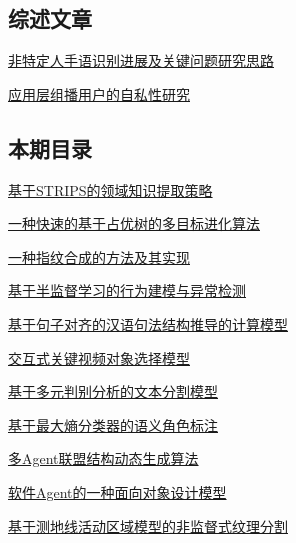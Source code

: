 \documentclass[a4paper]{article}
\begin{document}
\subsection{综述文章}
\href{http://www.jos.org.cn/ch/reader/download_pdf.aspx?file_no=20070301&year_id=2007&quarter_id=3&falg=1}{非特定人手语识别进展及关键问题研究思路}

\href{http://www.jos.org.cn/ch/reader/download_pdf.aspx?file_no=20070316&year_id=2007&quarter_id=3&falg=1}{应用层组播用户的自私性研究}

\subsection{本期目录}
\href{http://www.jos.org.cn/ch/reader/download_pdf.aspx?file_no=20070302&year_id=2007&quarter_id=3&falg=1}{基于STRIPS的领域知识提取策略}

\href{http://www.jos.org.cn/ch/reader/download_pdf.aspx?file_no=20070303&year_id=2007&quarter_id=3&falg=1}{一种快速的基于占优树的多目标进化算法}

\href{http://www.jos.org.cn/ch/reader/download_pdf.aspx?file_no=20070304&year_id=2007&quarter_id=3&falg=1}{一种指纹合成的方法及其实现}

\href{http://www.jos.org.cn/ch/reader/download_pdf.aspx?file_no=20070305&year_id=2007&quarter_id=3&falg=1}{基于半监督学习的行为建模与异常检测}

\href{http://www.jos.org.cn/ch/reader/download_pdf.aspx?file_no=20070306&year_id=2007&quarter_id=3&falg=1}{基于句子对齐的汉语句法结构推导的计算模型}

\href{http://www.jos.org.cn/ch/reader/download_pdf.aspx?file_no=20070307&year_id=2007&quarter_id=3&falg=1}{交互式关键视频对象选择模型}

\href{http://www.jos.org.cn/ch/reader/download_pdf.aspx?file_no=20070308&year_id=2007&quarter_id=3&falg=1}{基于多元判别分析的文本分割模型}

\href{http://www.jos.org.cn/ch/reader/download_pdf.aspx?file_no=20070309&year_id=2007&quarter_id=3&falg=1}{基于最大熵分类器的语义角色标注}

\href{http://www.jos.org.cn/ch/reader/download_pdf.aspx?file_no=20070310&year_id=2007&quarter_id=3&falg=1}{多Agent联盟结构动态生成算法}

\href{http://www.jos.org.cn/ch/reader/download_pdf.aspx?file_no=20070311&year_id=2007&quarter_id=3&falg=1}{软件Agent的一种面向对象设计模型}

\href{http://www.jos.org.cn/ch/reader/download_pdf.aspx?file_no=20070312&year_id=2007&quarter_id=3&falg=1}{基于测地线活动区域模型的非监督式纹理分割}
\end{document}
